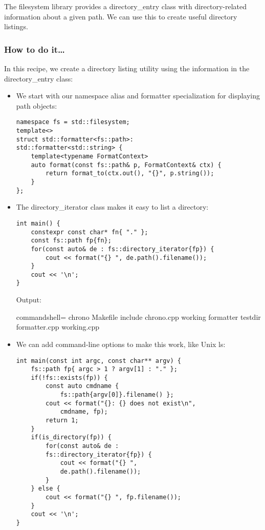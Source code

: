 

The filesystem library provides a directory\_entry class with directory-related information about a given path. We can use this to create useful directory listings.

\subsubsection{How to do it…}

In this recipe, we create a directory listing utility using the information in the directory\_entry class:

\begin{itemize}
\item 
We start with our namespace alias and formatter specialization for displaying path objects:

\begin{lstlisting}[style=styleCXX]
namespace fs = std::filesystem;
template<>
struct std::formatter<fs::path>:
std::formatter<std::string> {
	template<typename FormatContext>
	auto format(const fs::path& p, FormatContext& ctx) {
		return format_to(ctx.out(), "{}", p.string());
	}
};
\end{lstlisting}

\item 
The directory\_iterator class makes it easy to list a directory:

\begin{lstlisting}[style=styleCXX]
int main() {
	constexpr const char* fn{ "." };
	const fs::path fp{fn};
	for(const auto& de : fs::directory_iterator{fp}) {
		cout << format("{} ", de.path().filename());
	}
	cout << '\n';
}
\end{lstlisting}

Output:

\begin{tcblisting}{commandshell={}}
chrono Makefile include chrono.cpp working formatter
testdir formatter.cpp working.cpp
\end{tcblisting}

\item 
We can add command-line options to make this work, like Unix ls:

\begin{lstlisting}[style=styleCXX]
int main(const int argc, const char** argv) {
	fs::path fp{ argc > 1 ? argv[1] : "." };
	if(!fs::exists(fp)) {
		const auto cmdname {
			fs::path{argv[0]}.filename() };
		cout << format("{}: {} does not exist\n",
			cmdname, fp);
		return 1;
	}
	if(is_directory(fp)) {
		for(const auto& de :
		fs::directory_iterator{fp}) {
			cout << format("{} ",
			de.path().filename());
		}
	} else {
		cout << format("{} ", fp.filename());
	}
	cout << '\n';
}
\end{lstlisting}


\end{itemize}
